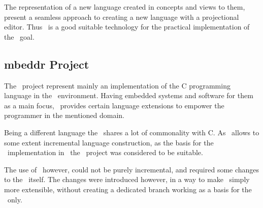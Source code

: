 The representation of a new language created in concepts and views to them, present a seamless approach to creating a new language with a projectional editor.
Thus \jbmps\ is a good suitable technology for the practical implementation of the \MT\ goal.

\subsection{mbeddr Project}

The \mbdr\ project represent mainly an implementation of the C programming language in the \jbmps\ environment. Having embedded systems
and software for them as a main focus, \mbdr\ provides certain language extensions to empower the programmer in the mentioned domain. 

Being a different language the \cpppl\ shares a lot of commonality with C. As \jbmps\ allows to some extent incremental language construction,
as the basis for the \cpppl\ implementation in \jbmps\ the \mbdr\ project was considered to be suitable. 

The use of \mbdr\, however, could not be purely incremental, and required some changes to the \mbdr\ itself. The changes were introduced however,
in a way to make \mbdr\ simply more extensible, without creating a dedicated branch working as a basis for the \cpppl\ only.